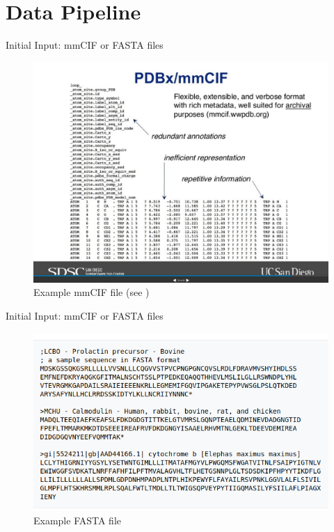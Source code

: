 \documentclass[presentation, smaller]{beamer}
\begin{document}
\section*{Data Pipeline}
\label{sec:orgb8f4bae}
\begin{frame}[label={sec:orgd3b3cfa}]{Initial Input: mmCIF or FASTA files}
\begin{figure}[htbp]
\centering
\includegraphics[height=0.8\textheight]{./imgs/mmcif-eg.png}
\caption{Example mmCIF file (see \protect\cite{PDB101LearnGuide})}
\end{figure}
\end{frame}


\begin{frame}[label={sec:org9fe96b5}]{Initial Input: mmCIF or FASTA files}
\begin{figure}[htbp]
\centering
\includegraphics[width=.9\linewidth]{./imgs/fastafiles_2021-07-20.png}
\caption{Example FASTA file}
\end{figure}
\end{frame}
\end{document}
